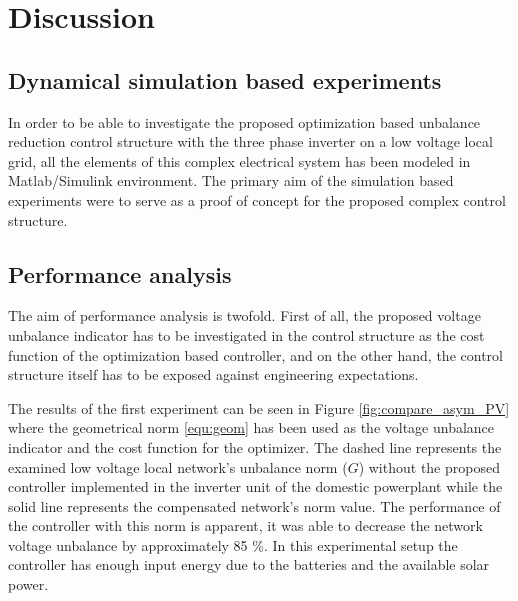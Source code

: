     \section{Discussion}\label{VUB:sec:Discussion}


    \subsection{Dynamical simulation based experiments}\label{VUB:sec:Results}
		
    In order to be able to investigate the proposed optimization based unbalance reduction control structure with the three phase inverter on a low voltage local grid, all the elements of this complex electrical system  has been modeled in Matlab/Simulink environment. The primary aim of the simulation based experiments were to serve as a proof of concept for the proposed complex control structure.

    \subsection{Performance analysis}\label{VUB:sec:Performance}

    The aim of performance analysis is twofold. First of all, the proposed voltage unbalance indicator has to be investigated in the control structure as the cost function of the optimization based controller, and on the other hand, the control structure itself has to be exposed against engineering expectations.


            The results of the first experiment can be seen in Figure \ref{fig:compare_asym_PV} where the geometrical norm \ref{equ:geom} has been used as the voltage unbalance indicator and the cost function for the optimizer.  The dashed line represents the examined low voltage local network's unbalance norm ($G$) without the proposed controller implemented in the inverter unit of the domestic powerplant while the solid line represents the compensated network's norm value. The performance of the controller with this norm is apparent, it was able to decrease the network voltage unbalance by approximately 85 \%. In this experimental setup the controller has enough input energy due to the batteries and the available solar power.

